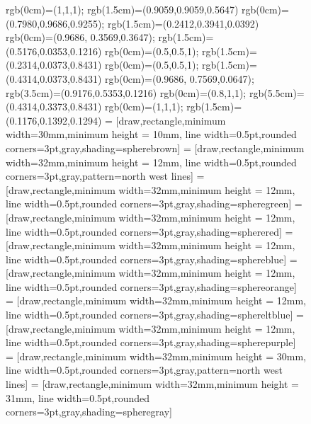 \documentclass[a4paper,10pt]{article}
\begin{document}
\newpage
\begin{figure}[h]\centering
    {rgb(0cm)=(1,1,1);
        rgb(1.5cm)=(0.9059,0.9059,0.5647)}
    {rgb(0cm)=(0.7980,0.9686,0.9255);
        rgb(1.5cm)=(0.2412,0.3941,0.0392)}
    {rgb(0cm)=(0.9686, 0.3569,0.3647);
        rgb(1.5cm)=(0.5176,0.0353,0.1216)}
    {rgb(0cm)=(0.5,0.5,1);
        rgb(1.5cm)=(0.2314,0.0373,0.8431)}
    {rgb(0cm)=(0.5,0.5,1);
        rgb(1.5cm)=(0.4314,0.0373,0.8431)}
    {rgb(0cm)=(0.9686, 0.7569,0.0647);
        rgb(3.5cm)=(0.9176,0.5353,0.1216)}
    {rgb(0cm)=(0.8,1,1);
        rgb(5.5cm)=(0.4314,0.3373,0.8431)}
    {rgb(0cm)=(1,1,1);
        rgb(1.5cm)=(0.1176,0.1392,0.1294)}
     = [draw,rectangle,minimum width=30mm,minimum height = 10mm, line width=0.5pt,rounded corners=3pt,gray,shading=spherebrown]
     = [draw,rectangle,minimum width=32mm,minimum height = 12mm, line width=0.5pt,rounded corners=3pt,gray,pattern=north west lines]
     = [draw,rectangle,minimum width=32mm,minimum height = 12mm, line width=0.5pt,rounded corners=3pt,gray,shading=spheregreen]
     = [draw,rectangle,minimum width=32mm,minimum height = 12mm, line width=0.5pt,rounded corners=3pt,gray,shading=spherered]
     = [draw,rectangle,minimum width=32mm,minimum height = 12mm, line width=0.5pt,rounded corners=3pt,gray,shading=sphereblue]
     = [draw,rectangle,minimum width=32mm,minimum height = 12mm, line width=0.5pt,rounded corners=3pt,gray,shading=sphereorange]
     = [draw,rectangle,minimum width=32mm,minimum height = 12mm, line width=0.5pt,rounded corners=3pt,gray,shading=sphereltblue]
     = [draw,rectangle,minimum width=32mm,minimum height = 12mm, line width=0.5pt,rounded corners=3pt,gray,shading=spherepurple]
     = [draw,rectangle,minimum width=32mm,minimum height = 30mm, line width=0.5pt,rounded corners=3pt,gray,pattern=north west lines]
     = [draw,rectangle,minimum width=32mm,minimum height = 31mm, line width=0.5pt,rounded corners=3pt,gray,shading=spheregray]

\end{figure}
\end{document}
